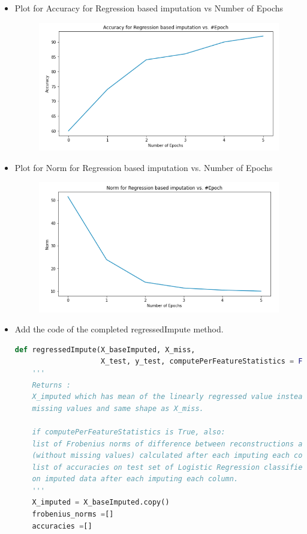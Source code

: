 \begin{itemize}
\item Plot for Accuracy for Regression based imputation vs Number of Epochs\\
    \begin{figure}[H]
    	\centering
    	\includegraphics[width=.7\textwidth]{templates/accuracy_vs_epoch}
    	\label{fig:my_label}
    \end{figure}

\item Plot for Norm for Regression based imputation vs. Number of Epochs\\
    \begin{figure}[H]
    	\centering
    	\includegraphics[width=.7\textwidth]{templates/norm_vs_epoch}
    	\label{fig:my_label}
    \end{figure}

\item
Add the code of the completed regressedImpute method. 
\begin{lstlisting}[language = Python, caption=regressedImpute method]
def regressedImpute(X_baseImputed, X_miss, 
                    X_test, y_test, computePerFeatureStatistics = False):
    '''
    Returns :
    X_imputed which has mean of the linearly regressed value instead of the 
    missing values and same shape as X_miss.

    if computePerFeatureStatistics is True, also:
    list of Frobenius norms of difference between reconstructions and original data 
    (without missing values) calculated after each imputing each column.
    list of accuracies on test set of Logistic Regression classifier trained 
    on imputed data after each imputing each column.
    '''
    X_imputed = X_baseImputed.copy()
    frobenius_norms =[]
    accuracies =[]
    

\end{lstlisting}
\end{itemize}
